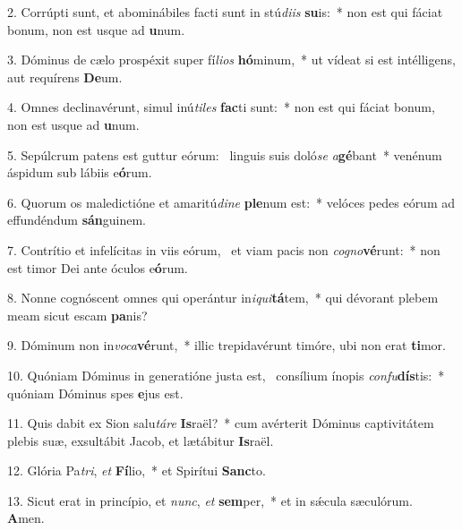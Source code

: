 2. Corrúpti sunt, et abominábiles facti sunt in stú\textit{di}\textit{is} \textbf{su}is:~*  non est qui fáciat bonum, non est usque ad \textbf{u}num.\

3. Dóminus de cælo prospéxit super fí\textit{li}\textit{os} \textbf{hó}minum,~*  ut vídeat si est intélligens, aut requírens \textbf{De}um.\

4. Omnes declinavérunt, simul inú\textit{ti}\textit{les} \textbf{fac}ti sunt:~*  non est qui fáciat bonum, non est usque ad \textbf{u}num.\

5. Sepúlcrum patens est guttur eórum: \dag\  linguis suis doló\textit{se} \textit{a}\textbf{gé}bant~*  venénum áspidum sub lábiis e\textbf{ó}rum.\

6. Quorum os maledictióne et amaritú\textit{di}\textit{ne} \textbf{ple}num est:~*  velóces pedes eórum ad effundéndum \textbf{sán}guinem.\

7. Contrítio et infelícitas in viis eórum, \dag\  et viam pacis non \textit{co}\textit{gno}\textbf{vé}runt:~*  non est timor Dei ante óculos e\textbf{ó}rum.\

8. Nonne cognóscent omnes qui operántur in\textit{i}\textit{qui}\textbf{tá}tem,~*  qui dévorant plebem meam sicut escam \textbf{pa}nis?\

9. Dóminum non in\textit{vo}\textit{ca}\textbf{vé}runt,~*  illic trepidavérunt timóre, ubi non erat \textbf{ti}mor.\

10. Quóniam Dóminus in generatióne justa est, \dag\  consílium ínopis \textit{con}\textit{fu}\textbf{dís}tis:~*  quóniam Dóminus spes \textbf{e}jus est.\

11. Quis dabit ex Sion salu\textit{tá}\textit{re} \textbf{Is}raël?~*  cum avérterit Dóminus captivitátem plebis suæ, exsultábit Jacob, et lætábitur \textbf{Is}raël.\

12. Glória Pa\textit{tri}, \textit{et} \textbf{Fí}lio,~*  et Spirítui \textbf{Sanc}to.\

13. Sicut erat in princípio, et \textit{nunc}, \textit{et} \textbf{sem}per,~*  et in sǽcula sæculórum. \textbf{A}men.\

